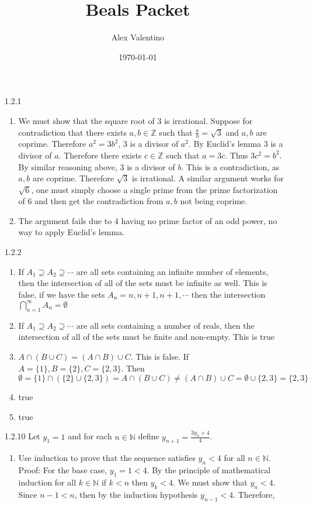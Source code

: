 \documentclass[12pt, letterpaper]{article}
\date{\today}
\author{Alex Valentino}
\title{Beals Packet}
\newcommand{\Z}{\mathbb{Z}}
\newcommand{\N}{\mathbb{N}}
\begin{document}
\begin{enumerate}
	\item[1.2.1]
		\begin{enumerate}
			\item We must show that the square root of $3$ is irrational.  Suppose for contradiction that there exists $a,b \in \Z$ such that $\frac{a}{b} = \sqrt{3}$ and $a,b$ are coprime.  Therefore $a^2 = 3 b^2$, 3 is a divisor of $a^2$. By Euclid's lemma 3 is a divisor of $a$.  Therefore there exists $c \in \Z$ such that $a = 3c$.  Thus $3c^2 = b^2$.  By similar reasoning above, $3$ is a divisor of $b$.  This is a contradiction, as $a,b$ are coprime.  Therefore $\sqrt{3}$ is irrational.    A similar argument works for $\sqrt{6}$, one must simply choose a single prime from the prime factorization of 6 and then get the contradiction from $a,b$ not being coprime.  
			\item The argument fails due to 4 having no prime factor of an odd power, no way to apply Euclid's lemma.  
		\end{enumerate}
	\item[1.2.2]
		\begin{enumerate}
			\item If $A_1 \supseteq A_2 \supseteq \cdots$ are all sets containing an infinite number of elements, then the intersection of all of the sets must be infinite as well.  This is false, if we have the sets $A_n = {n, n+1, n+1, \cdots}$ then the intersection $\bigcap_{n = 1}^\infty A_n = \emptyset$
			\item If $A_1 \supseteq A_2 \supseteq \cdots$ are all sets containing a number of reals, then the intersection of all of the sets must be finite and non-empty.  This is true
			\item $A \cap (B \cup C) = (A \cap B) \cup C$.  This is false.  If $A = \{1\}, B = \{2\}, C = \{2,3\}$.  Then $ \emptyset = \{1\} \cap (\{2\} \cup \{2,3\}	) = A \cap (B \cup C) \neq (A \cap B) \cup C = \emptyset \cup \{2,3\} = \{2,3\}$
			\item true
			\item true
		\end{enumerate}
	\item[1.2.10]
	Let $y_1 = 1$ and for each $n \in \N$ define $y_{n+1} = \frac{3y_n + 4}{4}$.
	\begin{enumerate}
		\item Use induction to prove that the sequence satisfies $y_n < 4$ for all $n \in \N$.\\
		Proof:  For the base case, $y_1 = 1 < 4$.  By the principle of mathematical induction for all $k \in \N$ if $k < n$ then $y_k < 4$.  We must show that $y_n < 4$.  Since $n-1 < n$, then by the induction hypothesis $y_{n-1} < 4$.  Therefore, 

\end{enumerate}
\end{enumerate}
\end{document}
